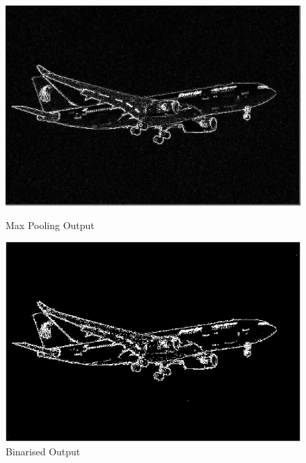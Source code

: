 \documentclass[12pt,a4paper]{report}
\begin{document}
\begin{figure}[!htb]
  \includegraphics[width=1\linewidth]{result_img/aeroplane_Q3.png}
  \caption{Max Pooling Output}
  \includegraphics[width=1\linewidth]{result_img/aeroplane_Q4.png}
  \caption{Binarised Output}
\end{figure}
\clearpage
\end{document}
